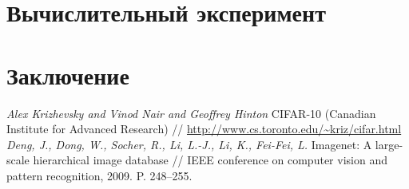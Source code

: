 \documentclass[12pt]{a&t}
\begin{document}
\section{Вычислительный эксперимент}



\section{Заключение}

\begin{thebibliography}{10}
	\textit{Alex Krizhevsky and Vinod Nair and Geoffrey Hinton} CIFAR-10 (Canadian Institute for Advanced Research) // \url{http://www.cs.toronto.edu/~kriz/cifar.html}
	\textit{Deng, J., Dong, W., Socher, R., Li, L.-J., Li, K., Fei-Fei, L. } Imagenet: A large-scale hierarchical image database //  IEEE conference on computer vision and pattern recognition, 2009. P. 248--255. 
	

\end{thebibliography}
\end{document}
